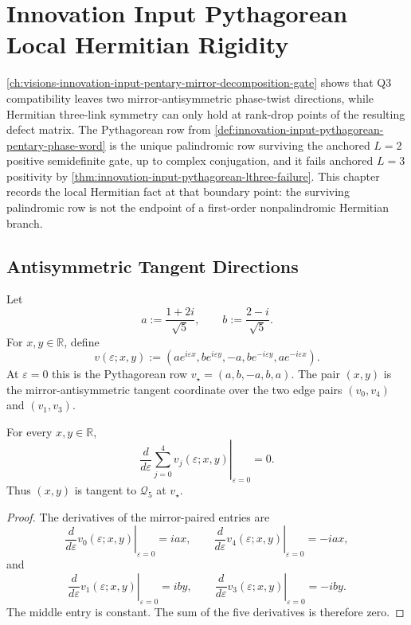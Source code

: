 \chapter{Innovation Input Pythagorean Local Hermitian Rigidity}
\label{ch:visions-innovation-input-pythagorean-local-hermitian-rigidity}

\autoref{ch:visions-innovation-input-pentary-mirror-decomposition-gate}
shows that Q3 compatibility leaves two mirror-antisymmetric phase-twist
directions, while Hermitian three-link symmetry can only hold at
rank-drop points of the resulting defect matrix. The Pythagorean row
from
\autoref{def:innovation-input-pythagorean-pentary-phase-word}
is the unique palindromic row surviving the anchored $L=2$ positive
semidefinite gate, up to complex conjugation, and it fails anchored
$L=3$ positivity by
\autoref{thm:innovation-input-pythagorean-lthree-failure}. This chapter
records the local Hermitian fact at that boundary point: the surviving
palindromic row is not the endpoint of a first-order nonpalindromic
Hermitian branch.

\section{Antisymmetric Tangent Directions}
\label{sec:innovation-input-pythagorean-antisymmetric-tangent-directions}

\begin{definition}
\label{def:innovation-input-pythagorean-antisymmetric-phase-perturbation}
Let
$$
a:=\frac{1+2i}{\sqrt5},
\qquad
b:=\frac{2-i}{\sqrt5}.
$$
For $x,y\in\mathbb R$, define
$$
v(\varepsilon;x,y)
:=
\left(
a e^{i\varepsilon x},
b e^{i\varepsilon y},
-a,
b e^{-i\varepsilon y},
a e^{-i\varepsilon x}
\right).
$$
At $\varepsilon=0$ this is the Pythagorean row $v_\star=(a,b,-a,b,a)$.
The pair $(x,y)$ is the mirror-antisymmetric tangent coordinate over the
two edge pairs $(v_0,v_4)$ and $(v_1,v_3)$.
\end{definition}

\begin{proposition}
\label{prop:innovation-input-pythagorean-antisymmetric-qthree-tangent}
For every $x,y\in\mathbb R$,
$$
\left.
\frac{d}{d\varepsilon}
\sum_{j=0}^4v_j(\varepsilon;x,y)
\right|_{\varepsilon=0}
=0.
$$
Thus $(x,y)$ is tangent to $\mathcal Q_5$ at $v_\star$.
\end{proposition}

\begin{proof}
The derivatives of the mirror-paired entries are
$$
\left.\frac{d}{d\varepsilon}v_0(\varepsilon;x,y)\right|_{\varepsilon=0}
=iax,
\qquad
\left.\frac{d}{d\varepsilon}v_4(\varepsilon;x,y)\right|_{\varepsilon=0}
=-iax,
$$
and
$$
\left.\frac{d}{d\varepsilon}v_1(\varepsilon;x,y)\right|_{\varepsilon=0}
=iby,
\qquad
\left.\frac{d}{d\varepsilon}v_3(\varepsilon;x,y)\right|_{\varepsilon=0}
=-iby.
$$
The middle entry is constant. The sum of the five derivatives is
therefore zero.
\end{proof}

